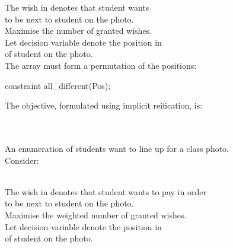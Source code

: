 \documentclass{cons-beamer}
\begin{document}
\begin{flashcardminizinc}
\begin{frame}[fragile]
\begin{example}
    The wish  in  denotes that student
     wants  \\ to be next to student  on the
    photo. \\ Maximise the  number of
    granted wishes.  \\[+5pt]

    Let decision variable  denote the position in
     \\ of student  on the
    photo. \\[+5pt]

    The array  must form a permutation of the
    positions:
    \begin{mznno}
constraint all_different(Pos);
    \end{mznno}\vfill
    The objective, formulated using implicit reification, is:
     \\[+3pt]
     \\
    ~~~~\mzninline{(}\texttt{~}
  \end{example}
\end{frame}

\begin{frame}[fragile]
  \begin{example}
    An enumeration  of students want to line up
    for a class photo. \\[+5pt]

    Consider: \\
    \footnotesize
    ~~~~\alert{} \\ \normalsize

    The wish  in  denotes that student
     wants \alert{to pay  in
      order} \\ to be next to student  on the photo. \\
    Maximise the \alert{weighted} number of granted wishes. \\[+5pt]

    Let decision variable  denote the position in
     \\ of student  on the
    photo. \\[+5pt]


\end{example}
\end{frame}
\end{flashcardminizinc}
\end{document}
